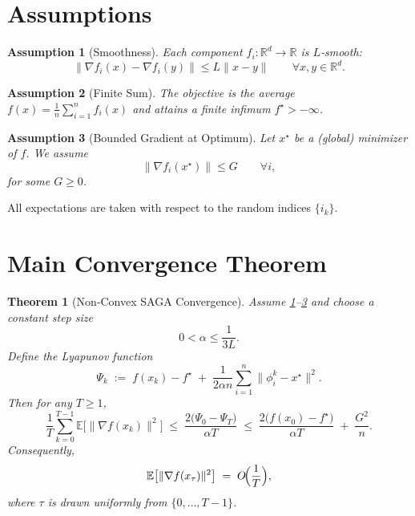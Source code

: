 \documentclass{article}
\newtheorem{theorem}{Theorem}
\newtheorem{assumption}{Assumption}
\newcommand{\EE}{\mathbb{E}}
\newcommand{\RR}{\mathbb{R}}
\begin{document}
\section*{Assumptions}
\begin{assumption}[Smoothness]\label{ass:smooth}
Each component $f_i:\RR^{d}\to\RR$ is $L$‑smooth:
\[
\|\nabla f_i(x)-\nabla f_i(y)\|\le L\|x-y\|\qquad\forall x,y\in\RR^{d}.
\]
\end{assumption}
\begin{assumption}[Finite Sum]\label{ass:finite}
The objective is the average $f(x)=\frac1n\sum_{i=1}^{n}f_i(x)$ and attains a finite infimum $f^{\star}>-\infty$.
\end{assumption}
\begin{assumption}[Bounded Gradient at Optimum]\label{ass:bounded}
Let $x^{\star}$ be a (global) minimizer of $f$. We assume
\[
\|\nabla f_i(x^{\star})\|\le G\qquad\forall i,
\]
for some $G\ge0$.
\end{assumption}
All expectations are taken with respect to the random indices $\{i_k\}$.

\section*{Main Convergence Theorem}
\begin{theorem}[Non‑Convex SAGA Convergence]\label{thm:main}
Assume \ref{ass:smooth}–\ref{ass:bounded} and choose a constant step size
\[
0<\alpha\le \frac{1}{3L}.
\]
Define the Lyapunov function
\[
\Psi_k\;:=\; f(x_k)-f^{\star}\;+\;\frac{1}{2\alpha n}\sum_{i=1}^{n}\|\phi_i^{k}-x^{\star}\|^{2}.
\tag{4}
\]
Then for any $T\ge1$,
\[
\frac{1}{T}\sum_{k=0}^{T-1}\EE\bigl[\|\nabla f(x_k)\|^{2}\bigr]
\;\le\;
\frac{2\bigl(\Psi_{0}-\Psi_{T}\bigr)}{\alpha T}
\;\le\;
\frac{2\bigl(f(x_0)-f^{\star}\bigr)}{\alpha T}
\;+\;
\frac{G^{2}}{n}.
\tag{5}
\]
Consequently,
\[
\EE\bigl[\|\nabla f(x_{\tau})\|^{2}\bigr]\;=\;O\!\Bigl(\frac{1}{T}\Bigr),
\]
where $\tau$ is drawn uniformly from $\{0,\dots,T-1\}$.
\end{theorem}

\end{document}
